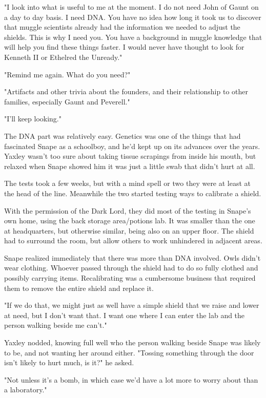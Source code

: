 "I look into what is useful to me at the moment. I do not need John of Gaunt on a day to day basis. I need DNA. You have no idea how long it took us to discover that muggle scientists already had the information we needed to adjust the shields. This is why I need you. You have a background in muggle knowledge that will help you find these things faster. I would never have thought to look for Kenneth II or Ethelred the Unready."

"Remind me again. What do you need?"

"Artifacts and other trivia about the founders, and their relationship to other families, especially Gaunt and Peverell."

"I'll keep looking."

The DNA part was relatively easy. Genetics was one of the things that had fascinated Snape as a schoolboy, and he'd kept up on its advances over the years. Yaxley wasn't too sure about taking tissue scrapings from inside his mouth, but relaxed when Snape showed him it was just a little swab that didn't hurt at all.

The tests took a few weeks, but with a mind spell or two they were at least at the head of the line. Meanwhile the two started testing ways to calibrate a shield.

With the permission of the Dark Lord, they did most of the testing in Snape's own home, using the back storage area\slash potions lab. It was smaller than the one at headquarters, but otherwise similar, being also on an upper floor. The shield had to surround the room, but allow others to work unhindered in adjacent areas.

Snape realized immediately that there was more than DNA involved. Owls didn't wear clothing. Whoever passed through the shield had to do so fully clothed and possibly carrying items. Recalibrating was a cumbersome business that required them to remove the entire shield and replace it.

"If we do that, we might just as well have a simple shield that we raise and lower at need, but I don't want that. I want one where I can enter the lab and the person walking beside me can't."

Yaxley nodded, knowing full well who the person walking beside Snape was likely to be, and not wanting her around either. "Tossing something through the door isn't likely to hurt much, is it?" he asked.

"Not unless it's a bomb, in which case we'd have a lot more to worry about than a laboratory."

